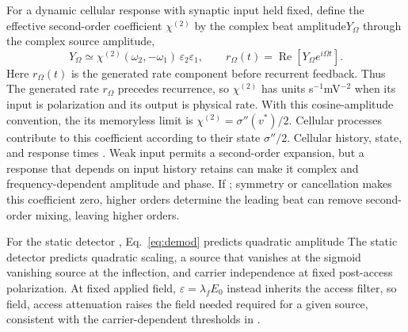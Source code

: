 \documentclass[11pt,a4paper]{article}
\newcommand{\Sig}{\sigma}
\providecommand{\DIFaddtex}[1]{{\protect\color{blue} \sf #1}} %
\providecommand{\DIFdeltex}[1]{{\protect\color{red} \scriptsize #1}} %
\providecommand{\DIFaddbegin}{} %
\providecommand{\DIFaddend}{} %
\providecommand{\DIFdelbegin}{} %
\providecommand{\DIFdelend}{} %
\providecommand{\DIFadd}[1]{\texorpdfstring{\DIFaddtex{#1}}{#1}} %
\providecommand{\DIFdel}[1]{\texorpdfstring{\DIFdeltex{#1}}{}} %
\begin{document}
For a dynamic cellular response with synaptic input held fixed, define
the \DIFdelbegin \DIFdel{effective }\DIFdelend second-order coefficient $\chi^{(2)}$ \DIFdelbegin \DIFdel{by the complex beat amplitude$Y_\Omega$}\DIFdelend \DIFaddbegin \DIFadd{through the complex source amplitude}\DIFaddend ,
\begin{equation}
Y_\Omega\simeq\chi^{(2)}(\omega_2,-\omega_1)\,
\varepsilon_2\varepsilon_1,\qquad
r_\Omega(t)=\operatorname{Re}\!\left[Y_\Omega e^{i\Omega t}\right].
\label{eq:chi2}
\end{equation}
\DIFdelbegin \DIFdel{Here $r_\Omega(t)$ is the generated rate component before recurrent feedback.
Thus }\DIFdelend \DIFaddbegin \DIFadd{The generated rate $r_\Omega$ precedes recurrence, so }\DIFaddend $\chi^{(2)}$ has units
s$^{-1}$mV$^{-2}$\DIFdelbegin \DIFdel{when its input is polarization
and its output is physical rate}\DIFdelend . With this cosine-amplitude convention, \DIFdelbegin \DIFdel{the }\DIFdelend \DIFaddbegin \DIFadd{its }\DIFaddend memoryless
limit is \DIFdelbegin \DIFdel{$\chi^{(2)}=\Sig''(v^*)/2$. Cellular processes contribute to this coefficient according to their state}\DIFdelend \DIFaddbegin \DIFadd{$\Sig''/2$. Cellular history, state, }\DIFaddend and response times \DIFdelbegin \DIFdel{. Weak input permits a second-order expansion, but a response
that depends on input history retains }\DIFdelend \DIFaddbegin \DIFadd{can make
it complex and }\DIFaddend frequency-dependent\DIFdelbegin \DIFdel{amplitude and phase.
If }\DIFdelend \DIFaddbegin \DIFadd{; }\DIFaddend symmetry or cancellation \DIFdelbegin \DIFdel{makes this coefficient zero, higher orders determine
the leading beat}\DIFdelend \DIFaddbegin \DIFadd{can remove
second-order mixing, leaving higher orders}\DIFaddend .

\DIFdelbegin \DIFdel{For the static detector , Eq.~\eqref{eq:demod} predicts quadratic amplitude
}\DIFdelend \DIFaddbegin \DIFadd{The static detector predicts quadratic }\DIFaddend scaling, a \DIFdelbegin \DIFdel{source that vanishes at the
sigmoid }\DIFdelend \DIFaddbegin \DIFadd{vanishing source at the
}\DIFaddend inflection, and carrier independence at fixed \DIFdelbegin \DIFdel{post-access }\DIFdelend polarization. At fixed \DIFdelbegin \DIFdel{applied field,
$\varepsilon=\lambda_f E_0$ instead inherits the access filter, so }\DIFdelend \DIFaddbegin \DIFadd{field,
access }\DIFaddend attenuation raises the field \DIFdelbegin \DIFdel{needed }\DIFdelend \DIFaddbegin \DIFadd{required }\DIFaddend for a given source, consistent
with \DIFdelbegin \DIFdel{the }\DIFdelend carrier-dependent thresholds \DIFdelbegin \DIFdel{in }\DIFdelend \cite{opancar2025,peripheral2023}.
\end{document}

